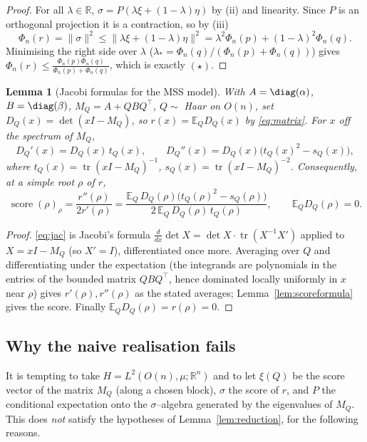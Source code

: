 \documentclass[12pt]{article}
\newtheorem{lemma}{Lemma}
\theoremstyle{definition}
\DeclareMathOperator{\score}{score}
\DeclareMathOperator{\tr}{tr}
\newcommand{\bR}{\mathbb{R}}
\newcommand{\bE}{\mathbb{E}}
\begin{document}
\begin{proof}
For all $\lambda\in\bR$, $\sigma=P(\lambda\xi+(1-\lambda)\eta)$ by (ii) and linearity. Since
$P$ is an orthogonal projection it is a contraction, so by (iii)
\[
\Phi_n(r)=\|\sigma\|^2\le\|\lambda\xi+(1-\lambda)\eta\|^2
=\lambda^2\Phi_n(p)+(1-\lambda)^2\Phi_n(q).
\]
Minimising the right side over $\lambda$ ($\lambda_*=\Phi_n(q)/(\Phi_n(p)+\Phi_n(q))$) gives
$\Phi_n(r)\le\frac{\Phi_n(p)\Phi_n(q)}{\Phi_n(p)+\Phi_n(q)}$, which is exactly $(\star)$.
\end{proof}

\begin{lemma}[Jacobi formulas for the MSS model]\label{lem:jacobi}
With $A=\diag(\alpha)$, $B=\diag(\beta)$, $M_Q=A+QBQ^\top$, $Q\sim$ Haar on $O(n)$, set
$D_Q(x)=\det(xI-M_Q)$, so $r(x)=\bE_Q D_Q(x)$ by \eqref{eq:matrix}. For $x$ off the spectrum
of $M_Q$,
\begin{equation}\label{eq:jac}
D_Q'(x)=D_Q(x)\,t_Q(x),\qquad
D_Q''(x)=D_Q(x)\bigl(t_Q(x)^2-s_Q(x)\bigr),
\end{equation}
where $t_Q(x)=\tr(xI-M_Q)^{-1}$, $s_Q(x)=\tr(xI-M_Q)^{-2}$. Consequently, at a simple root
$\rho$ of $r$,
\begin{equation}\label{eq:scoreavg}
\score(\rho)_\rho=\frac{r''(\rho)}{2r'(\rho)}
=\frac{\bE_Q\,D_Q(\rho)\bigl(t_Q(\rho)^2-s_Q(\rho)\bigr)}{2\,\bE_Q\,D_Q(\rho)\,t_Q(\rho)} ,
\qquad \bE_Q D_Q(\rho)=0 .
\end{equation}
\end{lemma}

\begin{proof}
\eqref{eq:jac} is Jacobi's formula $\frac{d}{dx}\det X=\det X\cdot\tr(X^{-1}X')$ applied to
$X=xI-M_Q$ (so $X'=I$), differentiated once more. Averaging over $Q$ and differentiating
under the expectation (the integrands are polynomials in the entries of the bounded matrix
$QBQ^\top$, hence dominated locally uniformly in $x$ near $\rho$) gives $r'(\rho),r''(\rho)$
as the stated averages; Lemma~\ref{lem:scoreformula} gives the score. Finally
$\bE_Q D_Q(\rho)=r(\rho)=0$.
\end{proof}

\subsection*{Why the naive realisation fails}

It is tempting to take $H=L^2(O(n),\mu;\bR^n)$ and to let $\xi(Q)$ be the score vector of the
matrix $M_Q$ (along a chosen block), $\sigma$ the score of $r$, and $P$ the conditional
expectation onto the $\sigma$--algebra generated by the eigenvalues of $M_Q$. This does
\emph{not} satisfy the hypotheses of Lemma~\ref{lem:reduction}, for the following reasons.
\end{document}
